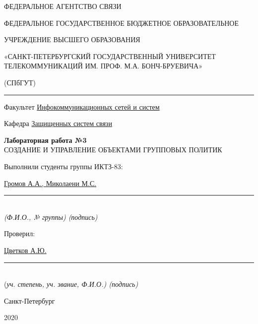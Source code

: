 \documentclass[a4paper,14pt]{extarticle}
\begin{document}
    \begin{center}
        \thispagestyle{empty}
        \begin{singlespace}
        ФЕДЕРАЛЬНОЕ АГЕНТСТВО СВЯЗИ

        ФЕДЕРАЛЬНОЕ ГОСУДАРСТВЕННОЕ БЮДЖЕТНОЕ ОБРАЗОВАТЕЛЬНОЕ

        УЧРЕЖДЕНИЕ ВЫСШЕГО ОБРАЗОВАНИЯ

        «САНКТ-ПЕТЕРБУРГСКИЙ ГОСУДАРСТВЕННЫЙ УНИВЕРСИТЕТ ТЕЛЕКОММУНИКАЦИЙ ИМ. ПРОФ. М.А. БОНЧ-БРУЕВИЧА»

        (СПбГУТ)
        \end{singlespace}
        \vspace{-1ex}
        \rule{\textwidth}{0.4pt}
        \vspace{-5ex}

        Факультет \underline{Инфокоммуникационных сетей и систем}

        Кафедра \underline{Защищенных систем связи}
        \vspace{10ex}

        \textbf{Лабораторная работа №3}\\
        СОЗДАНИЕ И УПРАВЛЕНИЕ ОБЪЕКТАМИ ГРУППОВЫХ ПОЛИТИК 


    \end{center}
    \vspace{4ex}
    \begin{flushright}
    \parbox{10 cm}{
    \begin{flushleft}
        Выполнили студенты группы ИКТЗ-83:

        \underline{Громов А.А., Миколаени М.С.} \hfill \rule[-0.85ex]{0.1\textwidth}{0.6pt}\\
        \vspace{-1ex}
        \footnotesize \textit{ (Ф.И.О., № группы) \hfill (подпись)} \normalsize

        Проверил:

        \underline{Цветков А.Ю.} \hfill \rule[-0.85ex]{0.1\textwidth}{0.6pt}\\
        \vspace{-1ex}
        (\footnotesize \textit{уч. степень, уч. звание, Ф.И.О.) \hfill (подпись)} \normalsize

    \end{flushleft}
    }
    \end{flushright}
    \begin{center}
        \vfill
        Санкт-Петербург

        2020

    \end{center}
    \newpage
\end{document}

